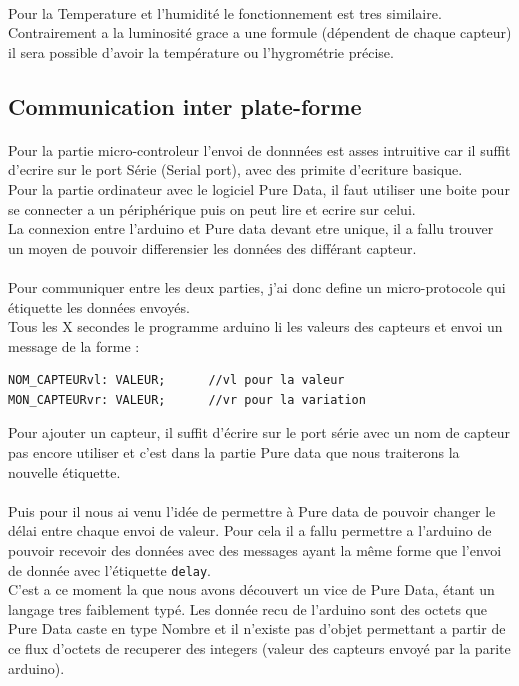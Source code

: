 \documentclass[a4paper, titlepage, oneside, 12pt]{article}%
\begin{document}
\paragraph{}
Pour la Temperature et l'humidité le fonctionnement est tres similaire. Contrairement a la luminosité grace a une formule (dépendent de chaque capteur) il sera possible d'avoir la température ou l'hygrométrie précise. 

\subsection{Communication inter plate-forme}
\paragraph{}
Pour la partie micro-controleur l'envoi de donnnées est asses intruitive car il suffit d'ecrire sur le port Série (Serial port), avec des primite d'ecriture basique.\\
Pour la partie ordinateur avec le logiciel Pure Data, il faut utiliser une boite pour se connecter a un périphérique puis on peut lire et ecrire sur celui.\\
La connexion entre l'arduino et Pure data devant etre unique, il a fallu trouver un moyen de pouvoir differensier les données des différant capteur. 

\paragraph{}
Pour communiquer entre les deux parties, j'ai donc define un micro-protocole qui étiquette les données envoyés.\\
Tous les X secondes le programme arduino li les valeurs des capteurs et envoi un message de la forme :
\begin{lstlisting}
NOM_CAPTEURvl: VALEUR;		//vl pour la valeur
MON_CAPTEURvr: VALEUR;		//vr pour la variation
\end{lstlisting}

Pour ajouter un capteur, il suffit d'écrire sur le port série avec un nom de capteur pas encore utiliser et c'est dans la partie Pure data que nous traiterons la nouvelle étiquette.

\paragraph{}
Puis pour il nous ai venu l'idée de permettre à Pure data de pouvoir changer le délai entre chaque envoi de valeur. 
Pour cela il a fallu permettre a l'arduino de pouvoir recevoir des données avec des messages ayant la même forme que l'envoi de donnée avec l'étiquette \texttt{delay}.\\
C'est a ce moment la que nous avons découvert un vice de Pure Data, étant un langage tres faiblement typé. Les donnée recu de l'arduino sont des octets que Pure Data caste en type Nombre et il n'existe pas d'objet permettant a partir de ce flux d'octets de recuperer des integers (valeur des capteurs envoyé par la parite arduino).\\
\end{document}
